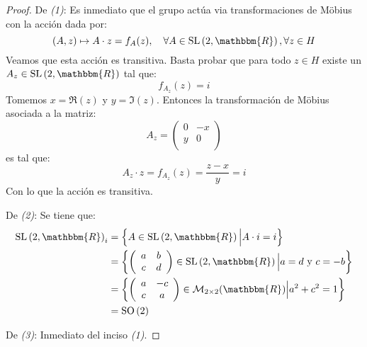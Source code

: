 \documentclass[12pt]{report}
\theoremstyle{largebreak}
\newcommand{\bbm}[1]{\ensuremath{\mathbbm{#1}}}
\newcommand{\SO}[1]{\ensuremath{\textup{SO}\left(#1\right)}}
\newcommand{\SL}[1]{\ensuremath{\textup{SL}\left(#1\right)}}
\begin{document}
    \begin{proof}
        De \textit{(1)}: Es inmediato que el grupo actúa via transformaciones de Möbius con la acción dada por:
        \begin{equation*}
            (A,z)\mapsto A\cdot z = f_A(z),\quad\forall A\in \SL{2,\bbm{R}},\forall z\in H
        \end{equation*}
        Veamos que esta acción es transitiva. Basta probar que para todo $z\in H$ existe un $A_z\in\SL{2,\bbm{R}}$ tal que:
        \begin{equation*}
            f_{A_z}(z)=i
        \end{equation*}
        Tomemos $x=\Re(z)$ y $y=\Im(z)$. Entonces la transformación de Möbius asociada a la matriz:
        \begin{equation*}
            A_z=\left(
                \begin{array}{cc}
                    0 & -x \\
                    y & 0 \\
                \end{array}
            \right)
        \end{equation*}
        es tal que:
        \begin{equation*}
            A_z\cdot z=f_{ A_z}(z)=\frac{z-x}{y}=i
        \end{equation*}
        Con lo que la acción es transitiva.

        De \textit{(2)}: Se tiene que:
        \begin{equation*}
            \begin{split}
                \SL{2,\bbm{R}}_i&=\left\{A\in\SL{2,\bbm{R}}\Big|A\cdot i=i \right\}\\
                &=\left\{\left(\begin{array}{cc}
                    a & b \\
                    c & d \\
                \end{array} \right) \in\SL{2,\bbm{R}}\Big|a = d\textup{ y }c=-b \right\}\\
                &=\left\{\left(\begin{array}{cc}
                    a & -c \\
                    c & a \\
                \end{array} \right) \in\mathcal{M}_{2\times2}(\bbm{R}) \Big|a^2+c^2=1 \right\}\\
                &=\SO{2}\\
            \end{split}
        \end{equation*}

        De \textit{(3)}: Inmediato del inciso \textit{(1)}.
    \end{proof}
\end{document}
